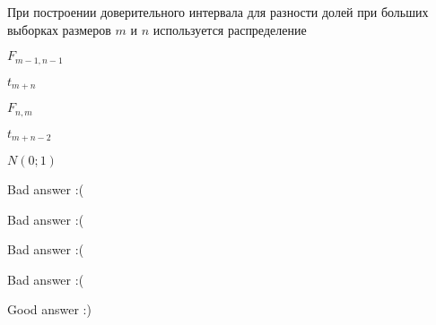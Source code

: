 
\begin{question}
При построении доверительного интервала для разности долей при больших
выборках размеров \(m\) и \(n\) используется распределение
\begin{answerlist}
  \item \(F_{m-1, n-1}\)
  \item \(t_{m+n}\)
  \item \(F_{n,m}\)
  \item \(t_{m+n-2}\)
  \item \(N(0;1)\)
\end{answerlist}
\end{question}

\begin{solution}
\begin{answerlist}
  \item Bad answer :(
  \item Bad answer :(
  \item Bad answer :(
  \item Bad answer :(
  \item Good answer :)
\end{answerlist}
\end{solution}

